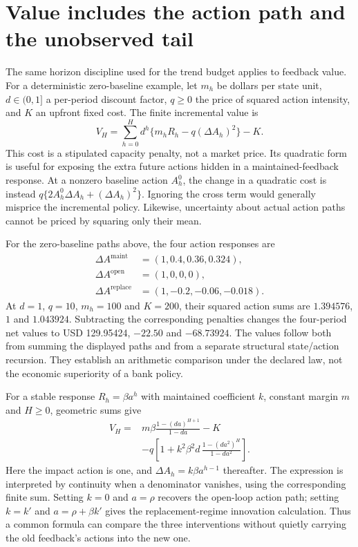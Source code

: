 \section{Value includes the action path and the unobserved tail}
\label{exec17:s6-value}

The same horizon discipline used for the trend budget applies to feedback
value. For a deterministic zero-baseline example, let $m_h$ be dollars per
state unit, $d\in(0,1]$ a per-period discount factor, $q\geq0$ the price
of squared action intensity, and $K$ an upfront fixed cost. The finite
incremental value is
\begin{equation}
 V_H=\sum_{h=0}^{H}d^h\{m_hR_h-q(\Delta A_h)^2\}-K.
 \label{exec17:s6-finite-value}
\end{equation}
This cost is a stipulated capacity penalty, not a market price. Its
quadratic form is useful for exposing the extra future actions hidden in
a maintained-feedback response. At a nonzero baseline action $A_h^0$,
the change in a quadratic cost is instead
$q\{2A_h^0\Delta A_h+(\Delta A_h)^2\}$. Ignoring the cross term
would generally misprice the incremental policy. Likewise, uncertainty
about actual action paths cannot be priced by squaring only their mean.

For the zero-baseline paths above, the four action responses are
\begin{align}
 \Delta A^{\mathrm{maint}}&=(1,0.4,0.36,0.324),\nonumber\\
 \Delta A^{\mathrm{open}}&=(1,0,0,0),\nonumber\\
 \Delta A^{\mathrm{replace}}&=(1,-0.2,-0.06,-0.018).
 \label{exec17:s6-action-paths}
\end{align}
At $d=1$, $q=10$, $m_h=100$ and $K=200$, their squared action sums
are $1.394576$, $1$ and $1.043924$. Subtracting the corresponding
penalties changes the four-period net values to USD 129.95424,
$-22.50$ and $-68.73924$. The values follow both from summing the
displayed paths and from a separate structural state/action recursion.
They establish an arithmetic comparison under the declared law, not the
economic superiority of a bank policy.~\citep{exec17_s6_math}

For a stable response $R_h=\beta a^h$ with maintained coefficient $k$,
constant margin $m$ and $H\geq0$, geometric sums give
\begin{align}
 V_H={}&m\beta\frac{1-(da)^{H+1}}{1-da}-K\nonumber\\
 &-q\left[1+k^2\beta^2d\,
                   \frac{1-(da^2)^H}{1-da^2}\right].
 \label{exec17:s6-geometric-value}
\end{align}
Here the impact action is one, and $\Delta A_h=k\beta a^{h-1}$
thereafter. The expression is interpreted by continuity when a denominator
vanishes, using the corresponding finite sum. Setting $k=0$ and
$a=\rho$ recovers the open-loop action path; setting $k=k'$ and
$a=\rho+\beta k'$ gives the replacement-regime innovation calculation.
Thus a common formula can compare the three interventions without
quietly carrying the old feedback's actions into the new one.

